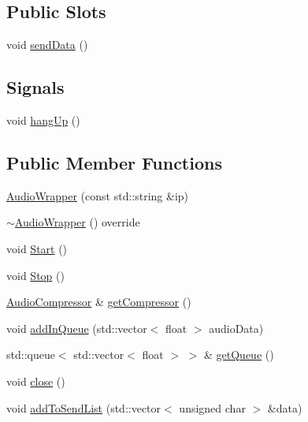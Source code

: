 \subsection*{Public Slots}
\begin{DoxyCompactItemize}
\item 
void \mbox{\hyperlink{classAudioWrapper_a8d77bd1e217129cfd8ec5ca25b16be04}{send\+Data}} ()
\end{DoxyCompactItemize}
\subsection*{Signals}
\begin{DoxyCompactItemize}
\item 
void \mbox{\hyperlink{classAudioWrapper_ae17f31e4b187479c5b09c1d23a85a3d6}{hang\+Up}} ()
\end{DoxyCompactItemize}
\subsection*{Public Member Functions}
\begin{DoxyCompactItemize}
\item 
\mbox{\hyperlink{classAudioWrapper_a13297af5ffc1d5f9d5d751820ef42acc}{Audio\+Wrapper}} (const std\+::string \&ip)
\item 
\mbox{\hyperlink{classAudioWrapper_ae46cc45c2060c761ab7e0d4901b19cc0}{$\sim$\+Audio\+Wrapper}} () override
\item 
void \mbox{\hyperlink{classAudioWrapper_aaa9ffbddfceadb866955a41eb17ac744}{Start}} ()
\item 
void \mbox{\hyperlink{classAudioWrapper_a95e9bb9ed67d20a5f895659b495ed53d}{Stop}} ()
\item 
\mbox{\hyperlink{classAudioCompressor}{Audio\+Compressor}} \& \mbox{\hyperlink{classAudioWrapper_ae5e70291c316e85167afcd89ea98e996}{get\+Compressor}} ()
\item 
void \mbox{\hyperlink{classAudioWrapper_a3364ec91d1a0d8d8a17e8f11ef4bcf6c}{add\+In\+Queue}} (std\+::vector$<$ float $>$ audio\+Data)
\item 
std\+::queue$<$ std\+::vector$<$ float $>$ $>$ \& \mbox{\hyperlink{classAudioWrapper_ae888485e4ce18c6d581b70f2f66ba2d8}{get\+Queue}} ()
\item 
void \mbox{\hyperlink{classAudioWrapper_af3b06805ea3a9e02a4ca5e6a88ad1eeb}{close}} ()
\item 
void \mbox{\hyperlink{classAudioWrapper_aa0f8b51535d46adfb4f37d8388d69604}{add\+To\+Send\+List}} (std\+::vector$<$ unsigned char $>$ \&data)
\end{DoxyCompactItemize}


